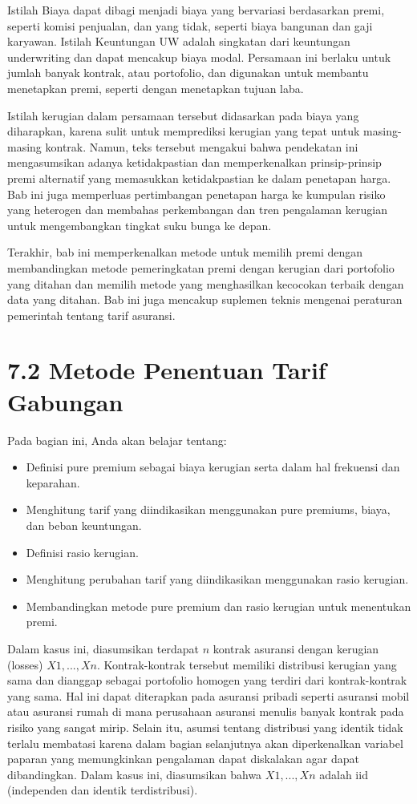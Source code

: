 \documentclass[
]{book}
\providecommand{\tightlist}{%
  \setlength{\itemsep}{0pt}\setlength{\parskip}{0pt}}
\begin{document}
Istilah Biaya dapat dibagi menjadi biaya yang bervariasi berdasarkan premi, seperti komisi penjualan, dan yang tidak, seperti biaya bangunan dan gaji karyawan. Istilah Keuntungan UW adalah singkatan dari keuntungan underwriting dan dapat mencakup biaya modal. Persamaan ini berlaku untuk jumlah banyak kontrak, atau portofolio, dan digunakan untuk membantu menetapkan premi, seperti dengan menetapkan tujuan laba.

Istilah kerugian dalam persamaan tersebut didasarkan pada biaya yang diharapkan, karena sulit untuk memprediksi kerugian yang tepat untuk masing-masing kontrak. Namun, teks tersebut mengakui bahwa pendekatan ini mengasumsikan adanya ketidakpastian dan memperkenalkan prinsip-prinsip premi alternatif yang memasukkan ketidakpastian ke dalam penetapan harga. Bab ini juga memperluas pertimbangan penetapan harga ke kumpulan risiko yang heterogen dan membahas perkembangan dan tren pengalaman kerugian untuk mengembangkan tingkat suku bunga ke depan.

Terakhir, bab ini memperkenalkan metode untuk memilih premi dengan membandingkan metode pemeringkatan premi dengan kerugian dari portofolio yang ditahan dan memilih metode yang menghasilkan kecocokan terbaik dengan data yang ditahan. Bab ini juga mencakup suplemen teknis mengenai peraturan pemerintah tentang tarif asuransi.

\hypertarget{metode-penentuan-tarif-gabungan}{%
\chapter{7.2 Metode Penentuan Tarif Gabungan}\label{metode-penentuan-tarif-gabungan}}

Pada bagian ini, Anda akan belajar tentang:

\begin{itemize}
\tightlist
\item
  Definisi pure premium sebagai biaya kerugian serta dalam hal frekuensi dan keparahan.
\item
  Menghitung tarif yang diindikasikan menggunakan pure premiums, biaya, dan beban keuntungan.
\item
  Definisi rasio kerugian.
\item
  Menghitung perubahan tarif yang diindikasikan menggunakan rasio kerugian.
\item
  Membandingkan metode pure premium dan rasio kerugian untuk menentukan premi.
\end{itemize}

Dalam kasus ini, diasumsikan terdapat \(n\) kontrak asuransi dengan kerugian (losses) \(X1,...,Xn\). Kontrak-kontrak tersebut memiliki distribusi kerugian yang sama dan dianggap sebagai portofolio homogen yang terdiri dari kontrak-kontrak yang sama. Hal ini dapat diterapkan pada asuransi pribadi seperti asuransi mobil atau asuransi rumah di mana perusahaan asuransi menulis banyak kontrak pada risiko yang sangat mirip. Selain itu, asumsi tentang distribusi yang identik tidak terlalu membatasi karena dalam bagian selanjutnya akan diperkenalkan variabel paparan yang memungkinkan pengalaman dapat diskalakan agar dapat dibandingkan. Dalam kasus ini, diasumsikan bahwa \(X1,...,Xn\) adalah iid (independen dan identik terdistribusi).
\end{document}
